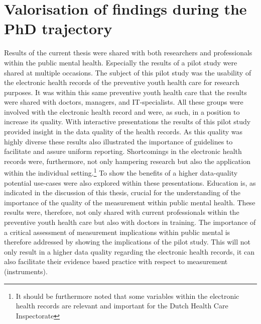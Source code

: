 \section*{Valorisation of findings during the PhD trajectory}
Results of the current thesis were shared with both researchers and professionals within the public mental health. Especially the results of a pilot study \parencite{Hoofs_DDJGZ} were shared at multiple occasions. The subject of this pilot study was the usability of the electronic health records of the preventive youth health care for research purposes. It was within this same preventive youth health care that the results were shared with doctors, managers, and IT-specialists. All these groups were involved with the electronic health record and were, as such, in a position to increase its quality. With interactive presentations the results of this pilot study provided insight in the data quality of the health records. As this quality was highly diverse these results also illustrated the importance of guidelines to facilitate and assure uniform reporting. Shortcomings in the electronic health records were, furthermore, not only hampering research but also the application within the individual setting.\footnote{It should be furthermore noted that some variables within the electronic health records are relevant and important for the Dutch Health Care Inspectorate} To show the benefits of a higher data-quality potential use-cases were also explored within these presentations. Education is, as indicated in the discussion of this thesis, crucial for the understanding of the importance of the quality of the measurement within public mental health. These results were, therefore, not only shared with current professionals within the preventive youth health care but also with doctors in training. The importance of a critical assessment of measurement implications within public mental is therefore addressed by showing the implications of the pilot study. This will not only result in a higher data quality regarding the electronic health records, it can also facilitate their evidence based practice with respect to measurement (instruments).

